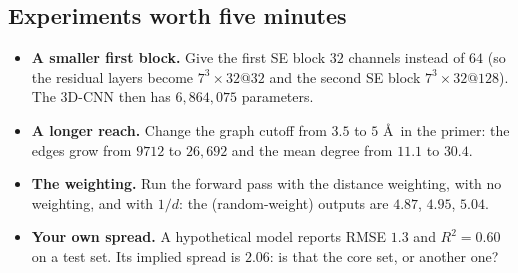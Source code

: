 \documentclass[11pt]{article}
\begin{document}
\subsection{Experiments worth five minutes}
\begin{itemize}[nosep]
  \item \textbf{A smaller first block.} Give the first SE block $32$ channels instead of $64$ (so the residual layers become $7^3\times32@32$ and the second SE block $7^3\times32@128$). The 3D-CNN then has $6{,}864{,}075$ parameters.
  \item \textbf{A longer reach.} Change the graph cutoff from $3.5$ to $5$ \AA\ in the primer: the edges grow from $9712$ to $26{,}692$ and the mean degree from $11.1$ to $30.4$.
  \item \textbf{The weighting.} Run the forward pass with the distance weighting, with no weighting, and with $1/d$: the (random-weight) outputs are $4.87$, $4.95$, $5.04$.
  \item \textbf{Your own spread.} A hypothetical model reports RMSE $1.3$ and $R^2=0.60$ on a test set. Its implied spread is $2.06$: is that the core set, or another one?
\end{itemize}

\end{document}
